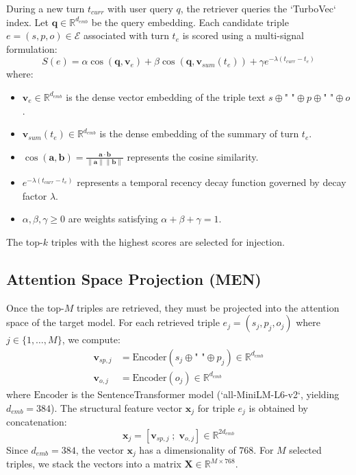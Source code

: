 \documentclass[conference]{IEEEtran}
\begin{document}
During a new turn $t_{curr}$ with user query $q$, the retriever queries the `TurboVec` index. Let $\mathbf{q} \in \mathbb{R}^{d_{emb}}$ be the query embedding. Each candidate triple $e = (s, p, o) \in \mathcal{E}$ associated with turn $t_e$ is scored using a multi-signal formulation:
\begin{equation}
S(e) = \alpha \cos(\mathbf{q}, \mathbf{v}_e) + \beta \cos(\mathbf{q}, \mathbf{v}_{sum}(t_e)) + \gamma e^{-\lambda(t_{curr} - t_e)}
\end{equation}
where:
\begin{itemize}
    \item $\mathbf{v}_e \in \mathbb{R}^{d_{emb}}$ is the dense vector embedding of the triple text $s \oplus \text{" "} \oplus p \oplus \text{" "} \oplus o$.
    \item $\mathbf{v}_{sum}(t_e) \in \mathbb{R}^{d_{emb}}$ is the dense embedding of the summary of turn $t_e$.
    \item $\cos(\mathbf{a}, \mathbf{b}) = \frac{\mathbf{a} \cdot \mathbf{b}}{\|\mathbf{a}\| \|\mathbf{b}\|}$ represents the cosine similarity.
    \item $e^{-\lambda(t_{curr} - t_e)}$ represents a temporal recency decay function governed by decay factor $\lambda$.
    \item $\alpha, \beta, \gamma \ge 0$ are weights satisfying $\alpha + \beta + \gamma = 1$.
\end{itemize}
The top-$k$ triples with the highest scores are selected for injection.

\subsection{Attention Space Projection (MEN)}
Once the top-$M$ triples are retrieved, they must be projected into the attention space of the target model. 
For each retrieved triple $e_j = (s_j, p_j, o_j)$ where $j \in \{1, \dots, M\}$, we compute:
\begin{align}
\mathbf{v}_{sp, j} &= \text{Encoder}(s_j \oplus \text{" "} \oplus p_j) \in \mathbb{R}^{d_{emb}} \\
\mathbf{v}_{o, j} &= \text{Encoder}(o_j) \in \mathbb{R}^{d_{emb}}
\end{align}
where $\text{Encoder}$ is the SentenceTransformer model (`all-MiniLM-L6-v2`, yielding $d_{emb} = 384$). The structural feature vector $\mathbf{x}_j$ for triple $e_j$ is obtained by concatenation:
\begin{equation}
\mathbf{x}_j = [\mathbf{v}_{sp, j} \;;\; \mathbf{v}_{o, j}] \in \mathbb{R}^{2d_{emb}}
\end{equation}
Since $d_{emb} = 384$, the vector $\mathbf{x}_j$ has a dimensionality of $768$. For $M$ selected triples, we stack the vectors into a matrix $\mathbf{X} \in \mathbb{R}^{M \times 768}$.
\end{document}
